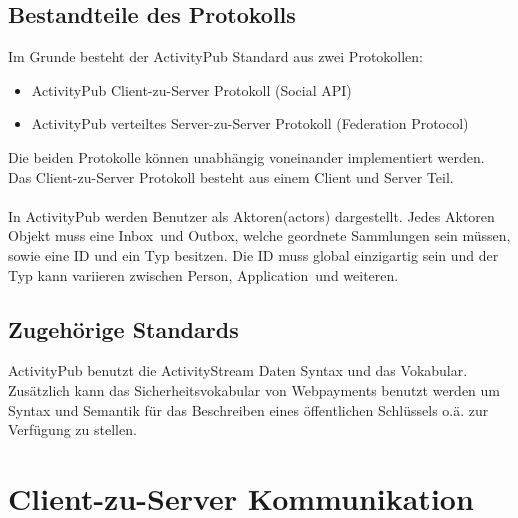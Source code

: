 \subsection{Bestandteile des Protokolls}
	Im Grunde besteht der ActivityPub Standard aus zwei Protokollen:
	\begin{itemize}
		\item ActivityPub Client-zu-Server Protokoll (Social API)
		\item ActivityPub verteiltes Server-zu-Server Protokoll (Federation Protocol)
	\end{itemize}
	Die beiden Protokolle können unabhängig voneinander implementiert werden. Das Client-zu-Server Protokoll besteht aus einem Client und Server Teil.
	\\\\ In ActivityPub werden Benutzer als \glqq Aktoren\grqq(actors) dargestellt. Jedes Aktoren Objekt muss eine \glqq Inbox\grqq~und \glqq Outbox\grqq, welche geordnete Sammlungen sein müssen, sowie eine ID und ein Typ besitzen\cite{activityPubActor}. Die ID muss global einzigartig sein und der Typ kann variieren zwischen \glqq Person\grqq, \glqq Application\grqq~und weiteren.\cite{activityStreamsCoreActor}

	

\subsection{Zugehörige Standards}
	ActivityPub benutzt die ActivityStream Daten Syntax und das Vokabular. Zusätzlich kann das Sicherheitsvokabular von Webpayments benutzt werden um Syntax und Semantik für das Beschreiben eines öffentlichen Schlüssels o.ä. zur Verfügung zu stellen.

\section{Client-zu-Server Kommunikation}

